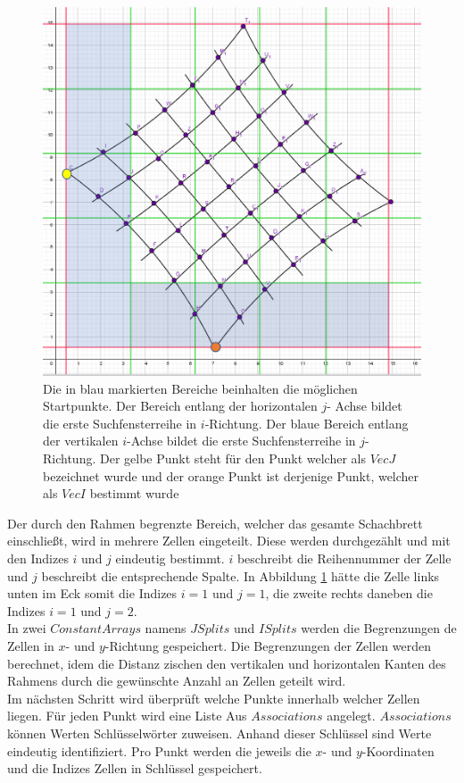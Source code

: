\begin{figure}[!htb]
	\centering
	\includegraphics[width=0.6\linewidth]{images/VerzeichnetesSchachbrett_1.png}
	\caption[Startpunktsuche in Schachbrettpunkten]{Die in blau markierten Bereiche beinhalten die möglichen Startpunkte. Der Bereich entlang der horizontalen $j$- Achse bildet die erste Suchfensterreihe in $i$-Richtung. Der blaue Bereich entlang der vertikalen $i$-Achse bildet die erste Suchfensterreihe in $j$-Richtung. Der gelbe Punkt steht für den Punkt welcher als $VecJ$ bezeichnet wurde und der orange Punkt ist derjenige Punkt, welcher als $VecI$ bestimmt wurde}
	\label{fig:7.1}
\end{figure}

Der durch den Rahmen begrenzte Bereich, welcher das gesamte Schachbrett einschließt, wird in mehrere Zellen eingeteilt. Diese werden durchgezählt und mit den Indizes $i$ und $j$ eindeutig bestimmt. $i$ beschreibt die Reihennummer der Zelle und $j$ beschreibt die entsprechende Spalte. In Abbildung \ref{fig:7.1} hätte die Zelle links unten im Eck somit die Indizes $i = 1$ und $j = 1$, die zweite rechts daneben die Indizes $i = 1$ und $j= 2$.\\

In zwei $ConstantArrays$ namens $JSplits$ und $ISplits$ werden die Begrenzungen de Zellen  in $x$- und $y$-Richtung gespeichert. Die Begrenzungen der Zellen werden berechnet, idem die  Distanz zischen den vertikalen und horizontalen Kanten des Rahmens durch die gewünschte Anzahl an Zellen geteilt wird.\\  

Im nächsten Schritt wird überprüft welche Punkte innerhalb welcher Zellen liegen. Für jeden Punkt wird eine Liste Aus $Associations$ angelegt.  $Associations$ können Werten Schlüsselwörter zuweisen. Anhand dieser Schlüssel sind Werte eindeutig identifiziert\cite{Mathematica}. Pro Punkt werden die jeweils die $x$- und $y$-Koordinaten und die Indizes Zellen in Schlüssel gespeichert.


